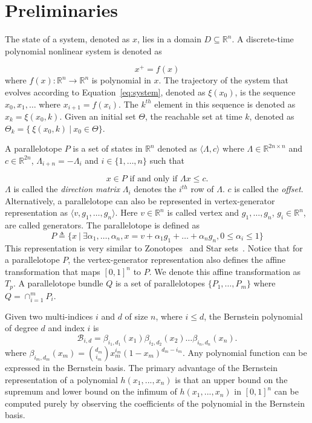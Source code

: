 \documentclass[EPiC]{easychair}
\begin{document}
\section{Preliminaries}

The state of a system, denoted as $x$, lies in a domain $D \subseteq \mathbb{R}^n$. A discrete-time polynomial nonlinear system is denoted as

\begin{equation}
    x^{+} = f(x)
\label{eq:system}
\end{equation}
where $f(x) : \mathbb{R}^n \rightarrow \mathbb{R}^n$ is polynomial in $x$. 
%
The trajectory of the system that evolves according to Equation~\eqref{eq:system}, denoted as $\xi(x_0)$, is the sequence $x_0, x_1, \ldots$ where $x_{i+1} = f(x_i)$. 
%
The $k^{th}$ element in this sequence is denoted as $x_k = \xi(x_0,k)$.
%
Given an initial set $\Theta$, the reachable set at time $k$, denoted as $\Theta_{k} = \{~ \xi(x_0,k)~|~ x_0 \in \Theta\}$.

A parallelotope $P$ is a set of states in $\mathbb{R}^{n}$ denoted as $\langle \Lambda, c\rangle$ where $\Lambda \in \mathbb{R}^{2n \times n}$ and $c \in \mathbb{R}^{2n}$, $\Lambda_{i+n} = -\Lambda_{i}$ and $i \in \{1, \ldots, n\}$ such that

$$
x \in P \mbox{ if and only if } \Lambda x \leq c.
$$
$\Lambda$ is called the \emph{direction matrix} $\Lambda_i$ denotes the $i^{th}$ row of $\Lambda$. $c$ is called the \emph{offset}. 
%
Alternatively, a parallelotope can also be represented in vertex-generator representation as $\langle v, g_1, \ldots, g_n\rangle$. Here $v \in \mathbb{R}^n$ is called vertex and $g_1, \ldots, g_n$, $g_i \in \mathbb{R}^n$, are called generators. The parallelotope is defined as
$$
P \triangleq \{ x ~|~ \exists \alpha_1, \ldots, \alpha_n, x = v + \alpha_1 g_1 + \ldots + \alpha_n g_n, 0 \leq \alpha_i \leq 1\}
$$
This representation is very similar to Zonotopes~\cite{girard2005reachability,althoff2010computing} and Star sets~\cite{duggirala2016parsimonious}. 
%
Notice that for a parallelotope $P$, the vertex-generator representation also defines the affine transformation that maps $[0,1]^{n}$ to $P$. 
%
We denote this affine transformation as $T_{p}$. 
%
A parallelotope bundle $Q$ is a set of parallelotopes $\{P_1, \ldots, P_m\}$ where $Q = \cap_{i=1}^{m}P_i$.

Given two multi-indices $i$ and $d$ of size $n$, where $i \leq d$, the Bernstein polynomial of degree $d$ and index $i$ is 
$$
\mathcal{B}_{i,d} = \beta_{i_1,d_1}(x_1) \beta_{i_2,d_2}(x_2)\ldots \beta_{i_n,d_n}(x_n).
$$
%
where $\beta_{i_m,d_m}(x_m) = \binom{d_m}{i_m}x_{m}^{i_m}(1-x_m)^{d_m - i_m}$. 
%
Any polynomial function can be expressed in the Bernstein basis. 
%
The primary advantage of the Bernstein representation of a polynomial $h(x_1,...,x_n)$ is that an upper bound on the supremum and lower bound on the infimum of $h(x_1,...,x_n)$ in $[0,1]^{n}$ can be computed purely by observing the coefficients of the polynomial in the Bernstein basis.
\end{document}
